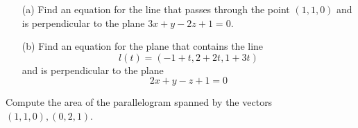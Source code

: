 \documentclass[openany]{book}
\begin{document}
\begin{prob}
    \begin{enumerate}
        \item[(a)] Find an equation for the line that passes through the point $(1,1,0)$ and is perpendicular to the plane $3x+y-2z+1=0$.
        \item[(b)] Find an equation for the plane that contains the line 
        \begin{equation*}
            l(t)=(-1+t, 2+2t, 1+3t)
        \end{equation*}
        and is perpendicular to the plane 
        \begin{equation*}
            2x+y-z+1=0
        \end{equation*}
    \end{enumerate}
\end{prob}

\begin{prob}
    Compute the area of the parallelogram spanned by the vectors $(1,1,0), (0,2,1)$.
\end{prob}
\end{document}
